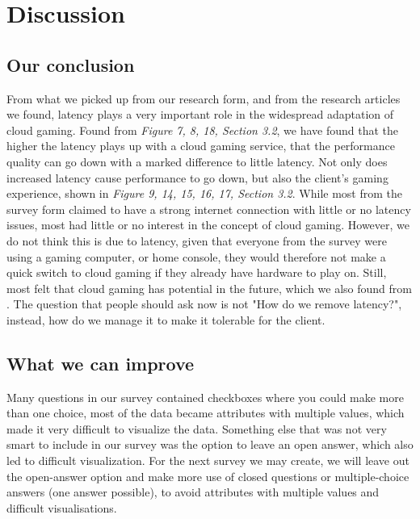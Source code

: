 \section{Discussion}

\subsection{Our conclusion}
From what we picked up from our research form, and from the research articles we found, latency plays a very important role in the widespread adaptation of cloud gaming. Found from \textit{Figure 7, 8, 18, Section 3.2}, we have found that the higher the latency plays up with a cloud gaming service, that the performance quality can go down with a marked difference to little latency. Not only does increased latency cause performance to go down, but also the client's gaming experience, shown in \textit{Figure 9, 14, 15, 16, 17, Section 3.2}. While most from the survey form claimed to have a strong internet connection with little or no latency issues, most had little or no interest in the concept of cloud gaming. However, we do not think this is due to latency, given that everyone from the survey were using a gaming computer, or home console, they would therefore not make a quick switch to cloud gaming if they already have hardware to play on. Still, most felt that cloud gaming has potential in the future, which we also found from \parencite[Chapter VI]{7536162}. The question that people should ask now is not "How do we remove latency?", instead, how do we manage it to make it tolerable for the client.\\

\subsection{What we can improve}
Many questions in our survey contained checkboxes where you could make more than one choice, most of the data became attributes with multiple values, which made it very difficult to visualize the data. Something else that was not very smart to include in our survey was the option to leave an open answer, which also led to difficult visualization. For the next survey we may create, we will leave out the open-answer option and make more use of closed questions or multiple-choice answers (one answer possible), to avoid attributes with multiple values and difficult visualisations.